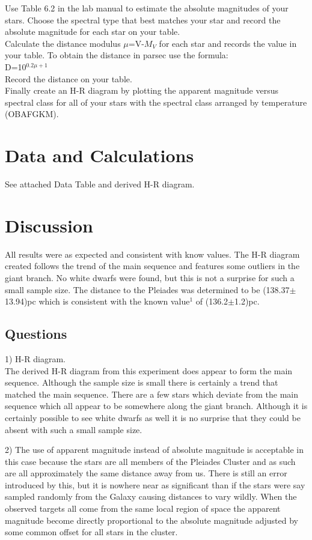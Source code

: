 \documentclass{article}
\begin{document}
Use Table 6.2 in the lab manual to estimate the absolute magnitudes of your stars. Choose the spectral type that best matches your star and record the absolute magnitude for each star on your table.\\

Calculate the distance modulus $\mu$=V-$M_V$ for each star and records the value in your table. To obtain the distance in parsec use the formula:\\

D=10$^{0.2\mu+1}$\\

Record the distance on your table.\\

Finally create an H-R diagram by plotting the apparent magnitude versus spectral class for all of your stars with the spectral class arranged by temperature (OBAFGKM).
\section{Data and Calculations}
See attached Data Table and derived H-R diagram.
\section{Discussion}
All results were as expected and consistent with know values. The H-R diagram created follows the trend of the main sequence and features some outliers in the giant branch. No white dwarfs were found, but this is not a surprise for such a small sample size. The distance to the Pleiades was determined to be (138.37$\pm$13.94)pc which is consistent with the known value$^1$ of (136.2$\pm$1.2)pc.
\subsection{Questions}
1) H-R diagram.\\
The derived H-R diagram from this experiment does appear to form the main sequence. Although the sample size is small there is certainly a trend that matched the main sequence. There are a few stars which deviate from the main sequence which all appear to be somewhere along the giant branch. Although it is certainly possible to see white dwarfs as well it is no surprise that they could be absent with such a small sample size.

2) The use of apparent magnitude instead of absolute magnitude is acceptable in this case because the stars are all members of the Pleiades Cluster and as such are all approximately the same distance away from us. There is still an error introduced by this, but it is nowhere near as significant than if the stars were say sampled randomly from the Galaxy causing distances to vary wildly. When the observed targets all come from the same local region of space the apparent magnitude become directly proportional to the absolute magnitude adjusted by some common offset for all stars in the cluster.\\
\end{document}
